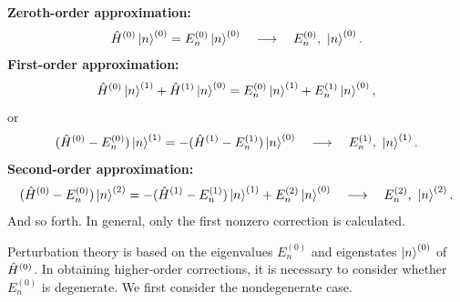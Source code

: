 \textbf{Zeroth-order approximation:}
\begin{equation}
 \hat{H}^{(0)}\left|n\right\rangle^{(0)}=E_n^{(0)}\left|n\right\rangle^{(0)}
 \quad\longrightarrow\quad E_n^{(0)},\ \left|n\right\rangle^{(0)}.
\end{equation}
\textbf{First-order approximation:}
\begin{equation}
 \hat{H}^{(0)}\left|n\right\rangle^{(1)}+\hat{H}^{(1)}\left|n\right\rangle^{(0)}
 =E_n^{(0)}\left|n\right\rangle^{(1)}+E_n^{(1)}\left|n\right\rangle^{(0)},
\end{equation}
or
\begin{equation}
 (\hat{H}^{(0)}-E_n^{(0)})\left|n\right\rangle^{(1)}
 =-(\hat{H}^{(1)}-E_n^{(1)})\left|n\right\rangle^{(0)}
 \quad\longrightarrow\quad E_n^{(1)},\ \left|n\right\rangle^{(1)}.
\end{equation}
\textbf{Second-order approximation:}
\begin{equation}
 (\hat{H}^{(0)}-E_n^{(0)})\left|n\right\rangle^{(2)}
 =-(\hat{H}^{(1)}-E_n^{(1)})\left|n\right\rangle^{(1)}
 +E_n^{(2)}\left|n\right\rangle^{(0)}
 \quad\longrightarrow\quad E_n^{(2)},\ \left|n\right\rangle^{(2)}.
\end{equation}
And so forth. In general, only the first nonzero correction is calculated.

Perturbation theory is based on the eigenvalues $E_n^{(0)}$ and eigenstates $\left|n\right\rangle^{(0)}$ of $\hat{H}^{(0)}$. In obtaining higher-order corrections, it is necessary to consider whether $E_n^{(0)}$ is degenerate. We first consider the nondegenerate case.